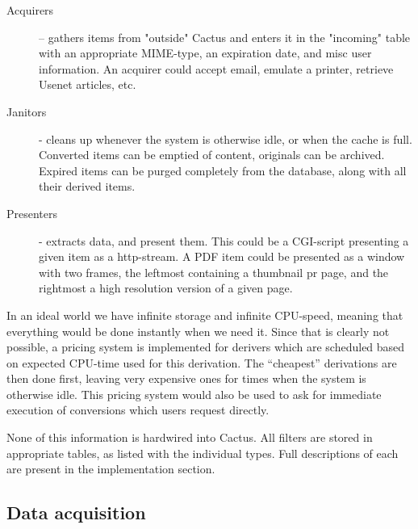 \begin{description}
\item[Acquirers] -- gathers items from "outside" Cactus and
  enters it in the "incoming" table with an appropriate
  MIME-type, an expiration date, and \textsf{misc user
    information}.  An acquirer could accept email, emulate a
  printer, retrieve Usenet articles, etc.
  
\item[Janitors] - cleans up whenever the system is otherwise
  idle, or when the cache is full.  Converted items can be
  emptied of content, originals can be archived.  Expired
  items can be purged completely from the database, along
  with all their derived items.
  
\item[Presenters] - extracts data, and present them.  This
  could be a CGI-script presenting a given item as a
  http-stream.  A PDF item could be presented as a window
  with two frames, the leftmost containing a thumbnail pr
  page, and the rightmost a high resolution version of a
  given page.
\end{description}

In an ideal world we have infinite storage and infinite CPU-speed, meaning that
everything would be done instantly when we need it.  Since that is clearly not
possible, a pricing system is implemented for derivers which are scheduled
based on expected CPU-time used for this derivation.  The ``cheapest''
derivations are then done first, leaving very expensive ones for times when the
system is otherwise idle.  This pricing system would also be used to ask for
immediate execution of conversions which users request directly.



None of this information is hardwired into Cactus.  All filters are stored in
appropriate tables, as listed with the individual types.  Full descriptions of
each are present in the implementation section.


\subsection{Data acquisition}



